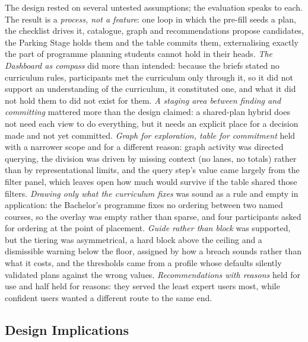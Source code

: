 \documentclass[a4paper,twoside]{article}
\begin{document}
\noindent The design rested on several untested assumptions; the evaluation speaks to each. The result is a \emph{process, not a feature}: one loop in which the pre-fill seeds a plan, the checklist drives it, catalogue, graph and recommendations propose candidates, the Parking Stage holds them and the table commits them, externalising exactly the part of programme planning students cannot hold in their heads. \emph{The Dashboard as compass} did more than intended: because the briefs stated no curriculum rules, participants met the curriculum only through it, so it did not support an understanding of the curriculum, it constituted one, and what it did not hold them to did not exist for them. \emph{A staging area between finding and committing} mattered more than the design claimed: a shared-plan hybrid does not need each view to do everything, but it needs an explicit place for a decision made and not yet committed. \emph{Graph for exploration, table for commitment} held with a narrower scope and for a different reason: graph activity was directed querying, the division was driven by missing context (no lanes, no totals) rather than by representational limits, and the query step's value came largely from the filter panel, which leaves open how much would survive if the table shared those filters. \emph{Drawing only what the curriculum fixes} was sound as a rule and empty in application: the Bachelor's programme fixes no ordering between two named courses, so the overlay was empty rather than sparse, and four participants asked for ordering at the point of placement. \emph{Guide rather than block} was supported, but the tiering was asymmetrical, a hard block above the ceiling and a dismissible warning below the floor, assigned by how a breach sounds rather than what it costs, and the thresholds came from a profile whose defaults silently validated plans against the wrong values. \emph{Recommendations with reasons} held for use and half held for reasons: they served the least expert users most, while confident users wanted a different route to the same end.

\subsection{Design Implications}
\end{document}
